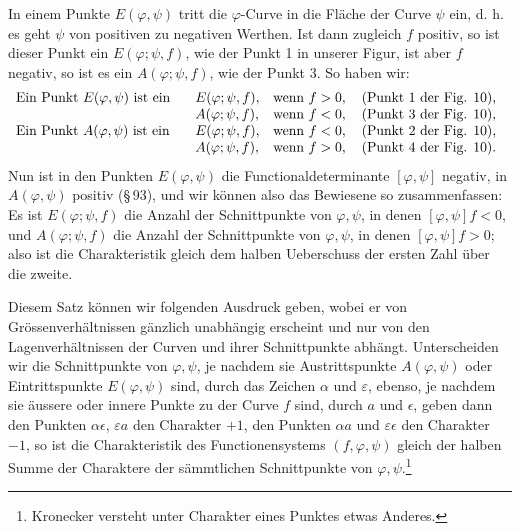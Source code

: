 \documentclass[11pt]{article}
\begin{document}
In einem Punkte $E(\varphi,\psi)$ tritt die $\varphi$-Curve in die Fläche der Curve $\psi$ ein, d. h. es geht $\psi$ von positiven zu negativen Werthen. Ist dann zugleich $f$ positiv, so ist dieser Punkt ein $E(\varphi;\psi,f)$, wie der Punkt 1 in unserer Figur, ist aber $f$ negativ, so ist es ein $A(\varphi;\psi,f)$, wie der Punkt 3. So haben wir:
\[
\begin{array}{ll}
\hbox{Ein Punkt }E(\varphi,\psi)\hbox{ ist ein }&
\begin{array}[t]{ll}
E(\varphi;\psi,f),&\hbox{wenn } f>0,\quad \hbox{(Punkt 1 der Fig. 10),}\\
A(\varphi;\psi,f),&\hbox{wenn } f<0,\quad \hbox{(Punkt 3 der Fig. 10),}
\end{array}\\[1.1em]
\hbox{Ein Punkt }A(\varphi,\psi)\hbox{ ist ein }&
\begin{array}[t]{ll}
E(\varphi;\psi,f),&\hbox{wenn } f<0,\quad \hbox{(Punkt 2 der Fig. 10),}\\
A(\varphi;\psi,f),&\hbox{wenn } f>0,\quad \hbox{(Punkt 4 der Fig. 10).}
\end{array}
\end{array}
\]
Nun ist in den Punkten $E(\varphi,\psi)$ die Functionaldeterminante $[\varphi,\psi]$ negativ, in $A(\varphi,\psi)$ positiv (\S\,93), und wir können also das Bewiesene so zusammenfassen: Es ist $E(\varphi;\psi,f)$ die Anzahl der Schnittpunkte von $\varphi,\psi$, in denen $[\varphi,\psi]f<0$, und $A(\varphi;\psi,f)$ die Anzahl der Schnittpunkte von $\varphi,\psi$, in denen $[\varphi,\psi]f>0$; also ist die Charakteristik gleich dem halben Ueberschuss der ersten Zahl über die zweite.

Diesem Satz können wir folgenden Ausdruck geben, wobei er von Grössenverhältnissen gänzlich unabhängig erscheint und nur von den Lagenverhältnissen der Curven und ihrer Schnittpunkte abhängt. Unterscheiden wir die Schnittpunkte von $\varphi,\psi$, je nachdem sie Austrittspunkte $A(\varphi,\psi)$ oder Eintrittspunkte $E(\varphi,\psi)$ sind, durch das Zeichen $\alpha$ und $\varepsilon$, ebenso, je nachdem sie äussere oder innere Punkte zu der Curve $f$ sind, durch $a$ und $\epsilon$, geben dann den Punkten $\alpha\epsilon$, $\varepsilon a$ den Charakter $+1$, den Punkten $\alpha a$ und $\varepsilon\epsilon$ den Charakter $-1$, so ist die Charakteristik des Functionensystems $(f,\varphi,\psi)$ gleich der halben Summe der Charaktere der sämmtlichen Schnittpunkte von $\varphi,\psi$.\footnote{Kronecker versteht unter Charakter eines Punktes etwas Anderes.}
\end{document}
